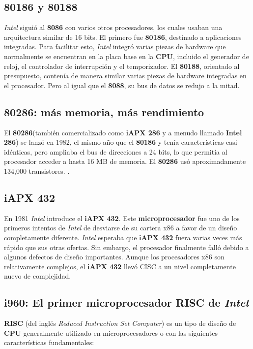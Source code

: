 \subsection{\textbf{80186} y \textbf{80188}}
\emph{Intel} siguió al \textbf{8086} con varios otros procesadores, los cuales usaban una arquitectura similar de 16 bits. El primero fue \textbf{80186}, 
destinado a aplicaciones integradas. Para facilitar esto, \emph{Intel} integró varias piezas de hardware que normalmente se encuentran en la 
placa base en la \textbf{CPU}, incluido el generador de reloj, el controlador de interrupción y el temporizador. El \textbf{80188}, orientado al presupuesto, 
contenía de manera similar varias piezas de hardware integradas en el procesador. Pero al igual que el \textbf{8088}, su bus de datos se redujo a la 
mitad.

\subsection{\textbf{80286}: más memoria, más rendimiento}
El \textbf{80286}(también comercializado como \textbf{iAPX 286} y a menudo llamado \textbf{Intel 286}) se lanzó en 1982, el mismo año que el \textbf{80186} y tenía
características casi idénticas, pero ampliaba el bus de direcciones a 24 bits, lo que permitía al procesador acceder a hasta 16 MB de memoria.
El \textbf{80286} usó aproximadamente 134,000 transistores. .

\subsection{\textbf{iAPX 432}}
En 1981 \emph{Intel}  introduce el \textbf{iAPX 432}. Este \textbf{microprocesador} fue uno de los primeros intentos de \emph{Intel} de desviarse de su cartera x86 a favor de un 
diseño completamente diferente. \emph{Intel} esperaba que \textbf{iAPX 432} fuera varias veces más rápido que sus otras ofertas. Sin embargo, el procesador 
finalmente falló debido a algunos defectos de diseño importantes. Aunque los procesadores x86 son relativamente complejos, el \textbf{iAPX 432} 
llevó CISC a un nivel completamente nuevo de complejidad.

\subsection{\textbf{i960}: El primer \textbf{microprocesador} \textbf{RISC} de \emph{Intel}}
\textbf{RISC} (del inglés \emph{Reduced Instruction Set Computer}) es un tipo de diseño de \textbf{CPU} generalmente utilizado en microprocesadores o 
con las siguientes características fundamentales:


